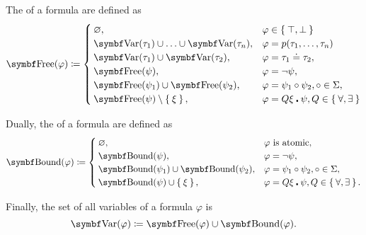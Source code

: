 \begin{definition}
\begin{DefEnum}
     The  of a formula are defined as
    \begin{equation}\label{eq:def:first_order_language/formula_free_variables}
      \Bold{Free}(\varphi) \coloneqq \begin{cases}
        \varnothing,                                            &\varphi \in \Set{ \top, \bot } \\
        \Bold{Var}(\tau_1) \cup \ldots \cup \Bold{Var}(\tau_n), &\varphi = p(\tau_1, \ldots, \tau_n) \\
        \Bold{Var}(\tau_1) \cup \Bold{Var}(\tau_2),             &\varphi = \tau_1 \doteq \tau_2, \\
        \Bold{Free}(\psi),                                      &\varphi = \neg \psi, \\
        \Bold{Free}(\psi_1) \cup \Bold{Free}(\psi_2),           &\varphi = \psi_1 \circ \psi_2, \circ \in \Sigma, \\
        \Bold{Free}(\psi) \setminus \Set{ \xi },                  &\varphi = Q \xi \centerdot \psi, Q \in \Set{ \forall, \exists }
      \end{cases}
    \end{equation}

     Dually, the  of a formula are defined as
    \begin{equation}\label{eq:def:first_order_language/formula_bound_variables}
      \Bold{Bound}(\varphi) \coloneqq \begin{cases}
        \varnothing,                                    &\varphi \text{ is atomic}, \\
        \Bold{Bound}(\psi),                             &\varphi = \neg \psi, \\
        \Bold{Bound}(\psi_1) \cup \Bold{Bound}(\psi_2), &\varphi = \psi_1 \circ \psi_2, \circ \in \Sigma, \\
        \Bold{Bound}(\psi) \cup \Set{ \xi },              &\varphi = Q \xi \centerdot \psi, Q \in \Set{ \forall, \exists }.
      \end{cases}
    \end{equation}

     Finally, the set of all variables of a formula \( \varphi \) is
    \begin{equation}\label{eq:def:first_order_language/formula_variables}
      \Bold{Var}(\varphi) \coloneqq \Bold{Free}(\varphi) \cup \Bold{Bound}(\varphi).
    \end{equation}
  \end{DefEnum}
\end{definition}


